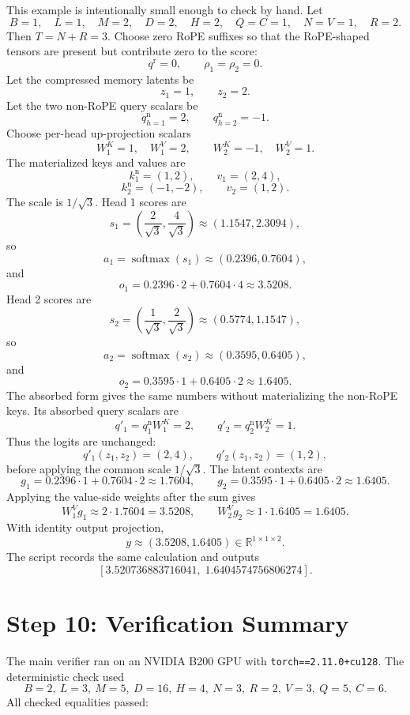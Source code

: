 \documentclass[11pt]{article}
\newcommand{\R}{\mathbb{R}}
\newcommand{\softmax}{\operatorname{softmax}}
\begin{document}
This example is intentionally small enough to check by hand.  Let
\[
  B=1,\quad L=1,\quad M=2,\quad D=2,\quad H=2,
  \quad Q=C=1,\quad N=V=1,\quad R=2.
\]
Then $T=N+R=3$.  Choose zero RoPE suffixes so that the RoPE-shaped tensors are
present but contribute zero to the score:
\[
  q^{\mathrm r}=0,\qquad \rho_1=\rho_2=0.
\]
Let the compressed memory latents be
\[
  z_1=1,\qquad z_2=2.
\]
Let the two non-RoPE query scalars be
\[
  q^{\mathrm n}_{h=1}=2,\qquad q^{\mathrm n}_{h=2}=-1.
\]
Choose per-head up-projection scalars
\[
  W^K_1=1,\quad W^V_1=2,
  \qquad
  W^K_2=-1,\quad W^V_2=1.
\]
The materialized keys and values are
\[
  k^{\mathrm n}_1=(1,2),\qquad v_1=(2,4),
\]
\[
  k^{\mathrm n}_2=(-1,-2),\qquad v_2=(1,2).
\]
The scale is $1/\sqrt{3}$.  Head 1 scores are
\[
  s_1=\left(\frac{2}{\sqrt{3}},\frac{4}{\sqrt{3}}\right)
  \approx(1.1547,2.3094),
\]
so
\[
  a_1=\softmax(s_1)\approx(0.2396,0.7604),
\]
and
\[
  o_1=0.2396\cdot2+0.7604\cdot4\approx3.5208.
\]
Head 2 scores are
\[
  s_2=\left(\frac{1}{\sqrt{3}},\frac{2}{\sqrt{3}}\right)
  \approx(0.5774,1.1547),
\]
so
\[
  a_2=\softmax(s_2)\approx(0.3595,0.6405),
\]
and
\[
  o_2=0.3595\cdot1+0.6405\cdot2\approx1.6405.
\]
The absorbed form gives the same numbers without materializing the non-RoPE
keys.  Its absorbed query scalars are
\[
  q'_1=q^{\mathrm n}_1W^K_1=2,\qquad
  q'_2=q^{\mathrm n}_2W^K_2=1.
\]
Thus the logits are unchanged:
\[
  q'_1(z_1,z_2)=(2,4),
  \qquad
  q'_2(z_1,z_2)=(1,2),
\]
before applying the common scale $1/\sqrt{3}$.  The latent contexts are
\[
  g_1=0.2396\cdot1+0.7604\cdot2\approx1.7604,
  \qquad
  g_2=0.3595\cdot1+0.6405\cdot2\approx1.6405.
\]
Applying the value-side weights after the sum gives
\[
  W^V_1g_1\approx2\cdot1.7604=3.5208,
  \qquad
  W^V_2g_2\approx1\cdot1.6405=1.6405.
\]
With identity output projection,
\[
  y\approx(3.5208,1.6405)\in\R^{1\times1\times2}.
\]
The script  records the
same calculation and outputs
\[
  [3.520736883716041,\;1.6404574756806274].
\]

\section{Step 10: Verification Summary}

The main verifier ran on an NVIDIA B200 GPU with
\texttt{torch==2.11.0+cu128}.  The deterministic check used
\[
  B=2,\ L=3,\ M=5,\ D=16,\ H=4,\ N=3,\ R=2,\ V=3,\ Q=5,\ C=6.
\]
All checked equalities passed:
\end{document}
